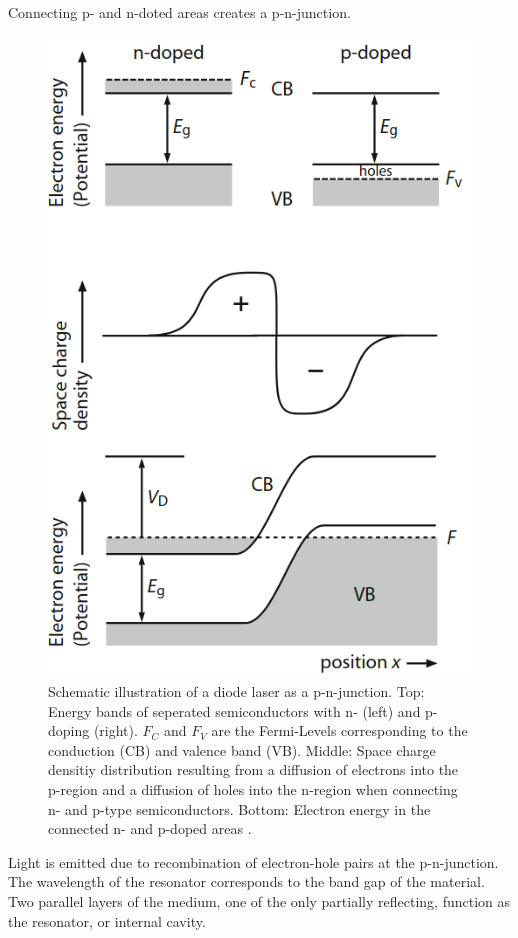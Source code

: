 Connecting p- and n-doted areas creates a p-n-junction. 
\begin{figure}
    \centering
    \includegraphics[width = 0.6\linewidth]{Bilder/semiconductor.png}
    \caption{Schematic illustration of a diode laser as a p-n-junction. 
    Top: Energy bands of seperated semiconductors with n- (left) and p-doping (right). $F_C$ and $F_V$ are the Fermi-Levels
    corresponding to the conduction (CB) and valence band (VB).
    Middle: Space charge densitiy distribution resulting from a diffusion of 
    electrons into the p-region and a diffusion of holes into the n-region 
    when connecting n- and p-type semiconductors.
    Bottom: Electron energy in the connected n- and p-doped areas \cite{eichler}.}
    \label{fig:semiconductor}
\end{figure}
Light is emitted due to recombination of electron-hole pairs at the p-n-junction.
The wavelength of the resonator corresponds to the band gap of the material.
Two parallel layers of the medium, one of the only partially reflecting, function as the 
resonator, or internal cavity.